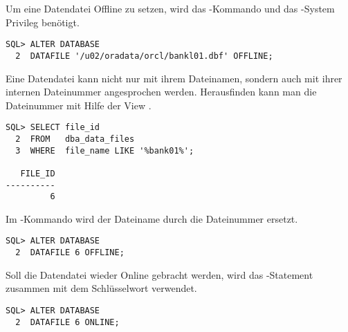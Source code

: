           Um eine Datendatei Offline zu setzen, wird das -Kommando und das -System Privileg benötigt.
          \begin{lstlisting}[caption={Eine Datendatei offline setzen},label=admin1470,language=oracle_sql]
SQL> ALTER DATABASE
  2  DATAFILE '/u02/oradata/orcl/bankl01.dbf' OFFLINE;
          \end{lstlisting}
          Eine Datendatei kann nicht nur mit ihrem Dateinamen, sondern auch mit ihrer internen Dateinummer angesprochen werden. Herausfinden kann man die Dateinummer mit Hilfe der View .
          \begin{lstlisting}[caption={Herausfinden der file\_id einer Datendatei},label=admin1471,language=oracle_sql]
SQL> SELECT file_id
  2  FROM   dba_data_files
  3  WHERE  file_name LIKE '%bank01%';

   FILE_ID
----------
         6
          \end{lstlisting}
          Im -Kommando wird der Dateiname durch die Dateinummer ersetzt.
          \begin{lstlisting}[caption={Eine Datendatei mit Hilfe der file\_id Offline setzen},label=admin1472,language=oracle_sql]
SQL> ALTER DATABASE
  2  DATAFILE 6 OFFLINE;
          \end{lstlisting}
          Soll die Datendatei wieder Online gebracht werden, wird das -Statement zusammen mit dem Schlüsselwort  verwendet.
          \begin{lstlisting}[caption={Eine Datendatei online setzen},label=admin1473,language=oracle_sql]
SQL> ALTER DATABASE
  2  DATAFILE 6 ONLINE;
          \end{lstlisting}
